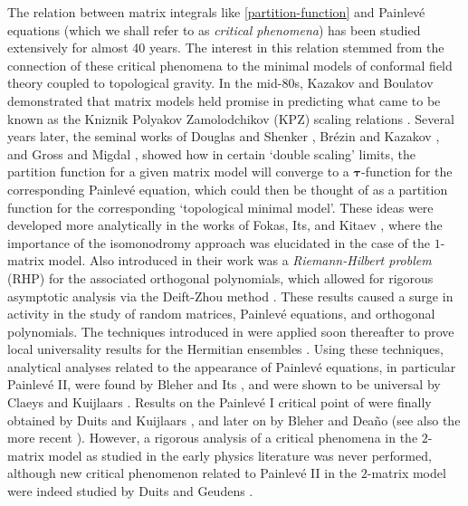 \documentclass[usenames,dvipsnames]{article}
\theoremstyle{definition}
\numberwithin{equation}{section}
\numberwithin{figure}{section}
\begin{document}
The relation between matrix integrals like \eqref{partition-function} and Painlev\'{e} equations (which we shall refer to as \textit{critical phenomena}) has been studied extensively for almost 40 years. The interest in this relation stemmed from the connection of these critical phenomena to the minimal models of conformal field theory coupled to topological gravity. In the mid-80s, Kazakov and Boulatov \cite{Kazakov1,Kazakov2} demonstrated that matrix models held promise in predicting what came to be known as the 
Kniznik Polyakov Zamolodchikov (KPZ) scaling relations \cite{KPZ}. Several years later, the seminal works of Douglas and Shenker \cite{DS}, Br\'{e}zin and Kazakov 
\cite{Kazakov3}, and Gross and Migdal \cite{GM1,GM2}, showed how in certain `double scaling' limits, the partition function for a given matrix model will converge 
to a $\boldsymbol{\tau}$-function for the corresponding Painlev\'{e} equation, which could then be thought of as a partition function for the corresponding `topological minimal model'. These ideas were developed more analytically in the works of Fokas, Its, and Kitaev \cite{FIK1,FIK2}, where the importance of the isomonodromy approach was elucidated in the case of the $1$-matrix model. Also introduced in their work was a \textit{Riemann-Hilbert problem} (RHP) for the associated orthogonal polynomials, which allowed for rigorous asymptotic analysis via the Deift-Zhou method \cite{Deift-Zhou}. These results caused a surge in activity in the study of random matrices, Painlev\'{e} equations, and orthogonal polynomials. The techniques introduced in \cite{Deift-Zhou} were applied soon thereafter to prove local universality results for the Hermitian ensembles \cite{DKMVZ,KMVV}.  Using these techniques, analytical analyses related to the appearance of Painlev\'{e} equations, in particular Painlev\'{e} II, were found by Bleher and Its \cite{BI}, and were shown to be universal by Claeys and Kuijlaars \cite{CK}. Results on the Painlev\'{e} I critical point of \cite{FIK1,FIK2} were finally obtained by Duits and Kuijlaars \cite{DK0}, and later on by Bleher and Dea\~{n}o \cite{BleherDeano} (see also the more recent \cite{Bertola-Tovbis, BGM}). However, a rigorous analysis of a critical phenomena in the $2$-matrix model as studied in the early physics literature was never performed, although new critical phenomenon related to Painlev\'{e} II in the $2$-matrix model were indeed studied by Duits and Geudens \cite{DG}.
\end{document}
